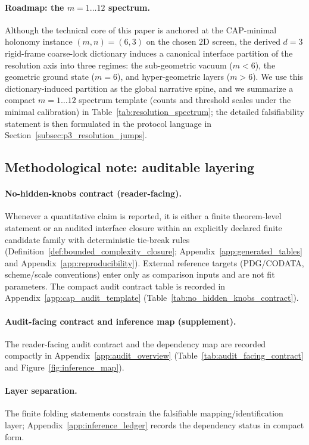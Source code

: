 \paragraph{Roadmap: the \texorpdfstring{$m=1\ldots 12$}{m=1..12} spectrum.}
Although the technical core of this paper is anchored at the CAP-minimal holonomy instance $(m,n)=(6,3)$ on the chosen $2$D screen, the derived $d=3$ rigid-frame coarse-lock dictionary induces a canonical interface partition of the resolution axis into three regimes:
the sub-geometric vacuum ($m<6$), the geometric ground state ($m=6$), and hyper-geometric layers ($m>6$).
We use this dictionary-induced partition as the global narrative spine, and we summarize a compact $m=1\ldots 12$ spectrum template (counts and threshold scales under the minimal calibration) in Table~\ref{tab:resolution_spectrum}; the detailed falsifiability statement is then formulated in the protocol language in Section~\ref{subsec:p3_resolution_jumps}.

\subsection{Methodological note: auditable layering}
\label{subsec:audit_layering}
\paragraph{No-hidden-knobs contract (reader-facing).}
\AuditTag Whenever a quantitative claim is reported, it is either a finite theorem-level statement or an audited interface closure within an explicitly declared finite candidate family with deterministic tie-break rules (Definition~\ref{def:bounded_complexity_closure}; Appendix~\ref{app:generated_tables} and Appendix~\ref{app:reproducibility}).
\MatchTag External reference targets (PDG/CODATA, scheme/scale conventions) enter only as comparison inputs and are not fit parameters.
The compact audit contract table is recorded in Appendix~\ref{app:cap_audit_template} (Table~\ref{tab:no_hidden_knobs_contract}).

\paragraph{Audit-facing contract and inference map (supplement).}
\AuditTag The reader-facing audit contract and the dependency map are recorded compactly in Appendix~\ref{app:audit_overview} (Table~\ref{tab:audit_facing_contract} and Figure~\ref{fig:inference_map}).

\paragraph{Layer separation.}
\MathTag The finite folding statements constrain \InterfaceTag the falsifiable mapping/identification layer; Appendix~\ref{app:inference_ledger} records the dependency status in compact form.

